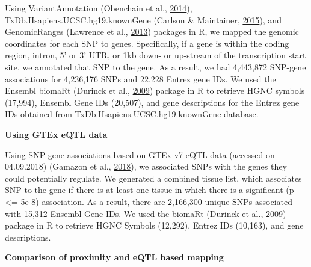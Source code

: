 \documentclass[12pt,twoside]{unicam}
\begin{document}
Using VariantAnnotation (Obenchain et al., \protect\hyperlink{ref-Obenchain2014}{2014}), TxDb.Hsapiens.UCSC.hg19.knownGene (Carlson \& Maintainer, \protect\hyperlink{ref-Carlson2015}{2015}), and GenomicRanges (Lawrence et al., \protect\hyperlink{ref-Lawrence2013}{2013}) packages in R, we mapped the genomic coordinates for each SNP to genes. Specifically, if a gene is within the coding region, intron, 5' or 3' UTR, or 1kb down- or up-stream of the transcription start site, we annotated that SNP to the gene. As a result, we had 4,443,872 SNP-gene associations for 4,236,176 SNPs and 22,228 Entrez gene IDs. We used the Ensembl biomaRt (Durinck et al., \protect\hyperlink{ref-Durinck2009}{2009}) package in R to retrieve HGNC symbols (17,994), Ensembl Gene IDs (20,507), and gene descriptions for the Entrez gene IDs obtained from TxDb.Hsapiens.UCSC.hg19.knownGene database.

\textbf{Using GTEx eQTL data}

Using SNP-gene associations based on GTEx v7 eQTL data (accessed on 04.09.2018) (Gamazon et al., \protect\hyperlink{ref-Gamazon2018}{2018}), we associated SNPs with the genes they could potentially regulate. We generated a combined tissue list, which associates SNP to the gene if there is at least one tissue in which there is a significant (p \textless= 5e-8) association. As a result, there are 2,166,300 unique SNPs associated with 15,312 Ensembl Gene IDs. We used the biomaRt (Durinck et al., \protect\hyperlink{ref-Durinck2009}{2009}) package in R to retrieve HGNC Symbols (12,292), Entrez IDs (10,163), and gene descriptions.

\textbf{Comparison of proximity and eQTL based mapping}
\end{document}
